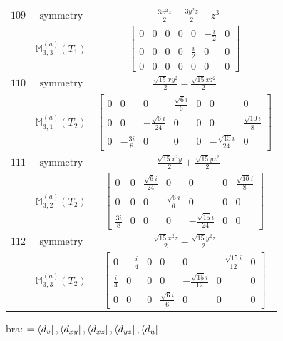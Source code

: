 \documentclass[fleqn,8pt,landscape]{jsarticle}
\begin{document}
\begin{longtable}{ccc}
$ 109 $ & $ \text{symmetry} $ & $ - \frac{3 x^{2} z}{2} - \frac{3 y^{2} z}{2} + z^{3} $ \\
$  $ & $ \mathbb{M}_{3,3}^{(a)}(T_{1}) $ & $ \begin{bmatrix} 0 & 0 & 0 & 0 & 0 & - \frac{i}{2} & 0 \\ 0 & 0 & 0 & 0 & \frac{i}{2} & 0 & 0 \\ 0 & 0 & 0 & 0 & 0 & 0 & 0 \end{bmatrix} $ \\ \hline
$ 110 $ & $ \text{symmetry} $ & $ \frac{\sqrt{15} x y^{2}}{2} - \frac{\sqrt{15} x z^{2}}{2} $ \\
$  $ & $ \mathbb{M}_{3,1}^{(a)}(T_{2}) $ & $ \begin{bmatrix} 0 & 0 & 0 & \frac{\sqrt{6} i}{6} & 0 & 0 & 0 \\ 0 & 0 & - \frac{\sqrt{6} i}{24} & 0 & 0 & 0 & \frac{\sqrt{10} i}{8} \\ 0 & - \frac{3 i}{8} & 0 & 0 & 0 & - \frac{\sqrt{15} i}{24} & 0 \end{bmatrix} $ \\ \hline
$ 111 $ & $ \text{symmetry} $ & $ - \frac{\sqrt{15} x^{2} y}{2} + \frac{\sqrt{15} y z^{2}}{2} $ \\
$  $ & $ \mathbb{M}_{3,2}^{(a)}(T_{2}) $ & $ \begin{bmatrix} 0 & 0 & \frac{\sqrt{6} i}{24} & 0 & 0 & 0 & \frac{\sqrt{10} i}{8} \\ 0 & 0 & 0 & \frac{\sqrt{6} i}{6} & 0 & 0 & 0 \\ \frac{3 i}{8} & 0 & 0 & 0 & - \frac{\sqrt{15} i}{24} & 0 & 0 \end{bmatrix} $ \\ \hline
$ 112 $ & $ \text{symmetry} $ & $ \frac{\sqrt{15} x^{2} z}{2} - \frac{\sqrt{15} y^{2} z}{2} $ \\
$  $ & $ \mathbb{M}_{3,3}^{(a)}(T_{2}) $ & $ \begin{bmatrix} 0 & - \frac{i}{4} & 0 & 0 & 0 & - \frac{\sqrt{15} i}{12} & 0 \\ \frac{i}{4} & 0 & 0 & 0 & - \frac{\sqrt{15} i}{12} & 0 & 0 \\ 0 & 0 & 0 & \frac{\sqrt{6} i}{6} & 0 & 0 & 0 \end{bmatrix} $ \\ \hline
\end{longtable}
bra: $=\bra{d_{v}}, \bra{d_{xy}}, \bra{d_{xz}}, \bra{d_{yz}}, \bra{d_{u}}$
\end{document}
